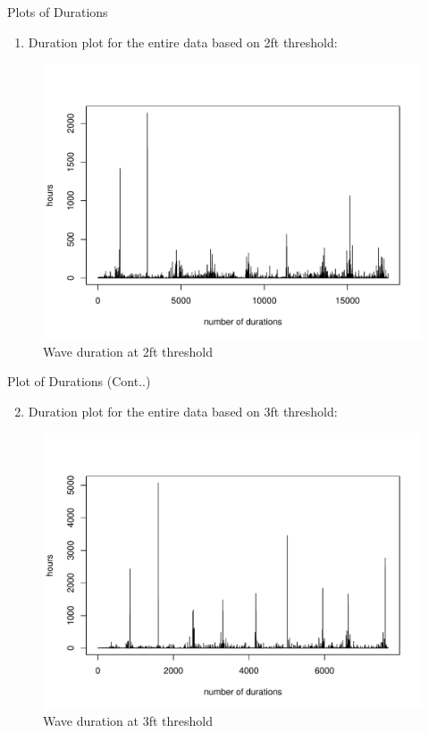 \documentclass[
  ignorenonframetext,
]{beamer}
\providecommand{\tightlist}{%
  \setlength{\itemsep}{0pt}\setlength{\parskip}{0pt}}
\begin{document}
\begin{frame}{Plots of Durations}
\protect\hypertarget{plots-of-durations}{}
\begin{enumerate}
[1)]
\tightlist
\item
  Duration plot for the entire data based on 2ft threshold:
\end{enumerate}

\begin{figure}
\includegraphics[width=1\linewidth]{dur_plot_2ft} \caption{Wave duration at 2ft threshold}\label{fig:2ft durations}
\end{figure}
\end{frame}

\begin{frame}{Plot of Durations (Cont..)}
\protect\hypertarget{plot-of-durations-cont..}{}
\begin{enumerate}
[1)]
\setcounter{enumi}{1}
\tightlist
\item
  Duration plot for the entire data based on 3ft threshold:
\end{enumerate}

\begin{figure}
\includegraphics[width=1\linewidth]{dur_plot_3ft} \caption{Wave duration at 3ft threshold}\label{fig:3ft durations}
\end{figure}
\end{frame}
\end{document}
